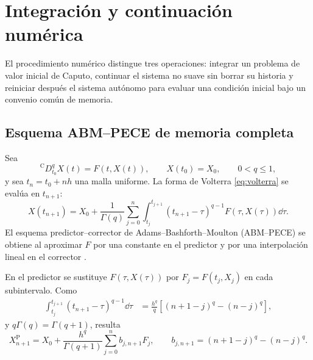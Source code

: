 \section{Integración y continuación numérica}
\label{sec:integracion_continuacion}

\HAFOCardContinuation

El procedimiento numérico distingue tres operaciones:
integrar un problema de valor inicial de Caputo, continuar el sistema no suave
sin borrar su historia y reiniciar después el sistema autónomo para evaluar una
condición inicial bajo un convenio común de memoria.

\subsection{Esquema ABM--PECE de memoria completa}
\label{sec:abm}

Sea
\begin{equation}
 {}^{\mathrm C}D_{t_0}^{q}X(t)=F(t,X(t)),\qquad X(t_0)=X_0,
 \qquad 0<q\leq 1,
\label{eq:pvi_abm}
\end{equation}
y sea \(t_n=t_0+nh\) una malla uniforme. La forma de Volterra
\cref{eq:volterra} se evalúa en \(t_{n+1}\):
\begin{equation}
 X(t_{n+1})=X_0+
 \frac{1}{\Gamma(q)}
 \sum_{j=0}^{n}
 \int_{t_j}^{t_{j+1}}
 (t_{n+1}-\tau)^{q-1}F(\tau,X(\tau))\dd\tau.
\label{eq:volterra_por_intervalos}
\end{equation}
El esquema predictor--corrector de Adams--Bashforth--Moulton (ABM--PECE)
se obtiene al aproximar \(F\) por una constante en el predictor y por una
interpolación lineal en el corrector \cite{DiethelmFordFreed2002}.

En el predictor se sustituye
\(F(\tau,X(\tau))\) por \(F_j=F(t_j,X_j)\) en cada subintervalo. Como
\begin{align}
\int_{t_j}^{t_{j+1}}(t_{n+1}-\tau)^{q-1}\dd\tau
&=\frac{h^q}{q}
\left[(n+1-j)^q-(n-j)^q\right],
\end{align}
y \(q\Gamma(q)=\Gamma(q+1)\), resulta
\begin{equation}
 X_{n+1}^{\mathrm P}=X_0+
 \frac{h^q}{\Gamma(q+1)}
 \sum_{j=0}^{n}b_{j,n+1}F_j,
\qquad
 b_{j,n+1}=(n+1-j)^q-(n-j)^q.
\label{eq:abm_predictor}
\end{equation}

